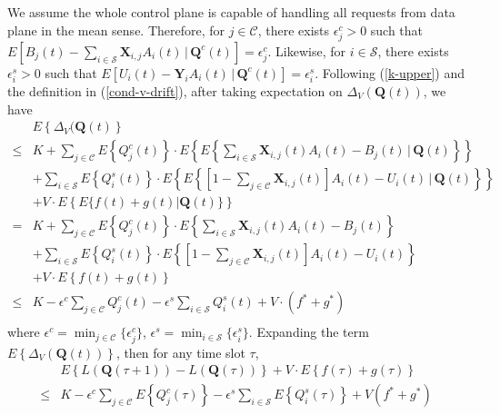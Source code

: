 \documentclass[10pt,journal,compsoc]{IEEEtran}
\begin{document}
We assume the whole control plane is capable of handling all requests from data plane in the mean sense. Therefore, 
for $j \in \mathcal{C}$, 
there exists $\epsilon^c_j > 0$ such that $E[B_j(t)-\sum_{i\in\mathcal{S}}\mathbf{X}_{i,j}A_i(t)\,|\,\mathbf{Q}^c(t)] = \epsilon^c_j$. Likewise, for $i \in \mathcal{S}$, 
there exists $\epsilon^s_i > 0$ such that $E[U_i(t)-\mathbf{Y}_i A_i(t)\,|\,\mathbf{Q}^c(t)] = \epsilon^s_i$.
Following (\ref{k-upper}) and the definition in (\ref{cond-v-drift}), after taking expectation on $\Delta_{V}( \mathbf{Q}(t) )$, we have
\begin{equation}
	\begin{array}{cl}
		& E \left\{ \Delta_{V}(\mathbf{Q}(t) \right\} \\
		\le & \displaystyle K + \sum_{j \in \mathcal{C}} E\left\{ Q_j^c(t) \right\} \cdot E\left\{ E\left\{ \sum_{i \in \mathcal{S}} \mathbf{X}_{i,j}(t) A_i(t) - B_j(t)\,|\,\mathbf{Q}(t)\right\} \right\} \\
		& \displaystyle + \sum_{i \in \mathcal{S}} E\left\{ Q_i^s(t) \right\} \cdot E\left\{ E\left\{ [1 - \sum_{j \in \mathcal{C}} \mathbf{X}_{i,j}(t)] A_i(t) - U_i(t)\,|\,\mathbf{Q}(t)\right\} \right\} \\
		& \displaystyle + V \cdot E\left\{ E\{ f(t) + g(t) |\mathbf{Q}(t) \} \right\} \\
		= & \displaystyle K + \sum_{j \in \mathcal{C}} E\left\{ Q_j^c(t) \right\} \cdot E\left\{ \sum_{i \in \mathcal{S}} \mathbf{X}_{i,j}(t) A_i(t) - B_j(t) \right\} \\
		& \displaystyle + \sum_{i \in \mathcal{S}} E\left\{ Q_i^s(t) \right\} \cdot E\left\{ [1 - \sum_{j \in \mathcal{C}} \mathbf{X}_{i,j}(t)] A_i(t) - U_i(t) \right\} \\
		& \displaystyle + V \cdot E \left\{ f(t) + g(t) \right\} \\
		\le & \displaystyle K - \epsilon^c \sum_{j \in \mathcal{C}} Q_j^c(t) - \epsilon^s \sum_{i \in \mathcal{S}} Q_i^s(t) + V \cdot (f^* + g^*) \\
	\end{array}
\end{equation}
where $\epsilon^c = \min_{j \in \mathcal{C}} \{ \epsilon^c_j \}$, $\epsilon^s = \min_{i \in \mathcal{S}} \{ \epsilon^s_i \}$. Expanding the term $E\left\{ \Delta_{V}(\mathbf{Q}(t)) \right\}$, then for any time slot $\tau$,  
\begin{equation}
	\begin{array}{cl}
		& \displaystyle E\left\{ L\left(\mathbf{Q}(\tau + 1) \right) - L\left(\mathbf{Q}(\tau) \right) \right\} + V \cdot E\left\{ f(\tau) + g(\tau) \right\} \\
		\le & \displaystyle K - \epsilon^c \sum_{j \in \mathcal{C}} E\left\{Q_j^c(\tau)\right\} - \epsilon^s \sum_{i \in \mathcal{S}} E\left\{Q_i^s(\tau)\right\} + V (f^* + g^*) \\
	\end{array}
\end{equation}
\end{document}

